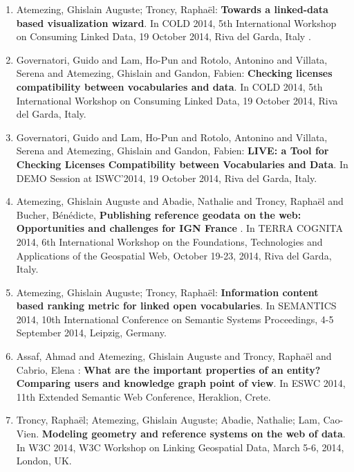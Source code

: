 \begin{enumerate}
\item Atemezing, Ghislain Auguste; Troncy,  Rapha{\"e}l: \textbf{{T}owards a linked-data based visualization wizard}. In {COLD} 2014, 5th {I}nternational {W}orkshop on {C}onsuming {L}inked {D}ata, 19 {O}ctober 2014, {R}iva del {G}arda, {I}taly .

\item {G}overnatori, {G}uido and  {L}am, {H}o-{P}un and  {R}otolo, {A}ntonino and  {V}illata, {S}erena and  {A}temezing, {G}hislain and  {G}andon, {F}abien: \textbf{{C}hecking licenses compatibility between vocabularies and data}. In {COLD} 2014, 5th {I}nternational {W}orkshop on {C}onsuming {L}inked {D}ata, 19 {O}ctober 2014, {R}iva del {G}arda, {I}taly.

\item {G}overnatori, {G}uido and  {L}am, {H}o-{P}un and  {R}otolo, {A}ntonino and  {V}illata, {S}erena and  {A}temezing, {G}hislain and  {G}andon, {F}abien: \textbf{LIVE: a Tool for Checking Licenses Compatibility between Vocabularies and Data}. In {DEMO Session} at ISWC'2014, 19 {O}ctober 2014, {R}iva del {G}arda, {I}taly.

\item{A}temezing, {G}hislain {A}uguste and  {A}badie, {N}athalie and  {T}roncy, {R}apha{\"e}l and  {B}ucher, {B}{\'e}n{\'e}dicte, \textbf{{P}ublishing reference geodata on the web: {O}pportunities and challenges for {IGN} {F}rance }. In {TERRA} {COGNITA} 2014, 6th {I}nternational {W}orkshop on the {F}oundations, {T}echnologies and {A}pplications of the {G}eospatial {W}eb, {O}ctober 19-23, 2014, {R}iva del {G}arda, {I}taly.

\item Atemezing, Ghislain Auguste; Troncy,  Rapha{\"e}l: \textbf{{I}nformation content based ranking metric for linked open vocabularies}. In {SEMANTICS} 2014, 10th {I}nternational {C}onference on {S}emantic {S}ystems {P}roceedings, 4-5 {S}eptember 2014, {L}eipzig, {G}ermany.

\item {A}ssaf, {A}hmad and  {A}temezing,  {G}hislain {A}uguste and  {T}roncy, {R}apha{\"e}l and  {C}abrio, {E}lena : \textbf{{W}hat are the important properties of an entity? {C}omparing users and knowledge graph point of view}. In {ESWC} 2014, 11th {E}xtended {S}emantic {W}eb {C}onference, {H}eraklion, {C}rete.

\item Troncy, Rapha{\"e}l; Atemezing, Ghislain Auguste; Abadie, Nathalie; Lam, Cao-Vien. \textbf{Modeling geometry and reference systems on the web of data}. In W3C 2014, W3C Workshop on Linking Geospatial Data, March 5-6, 2014, London, UK.


\end{enumerate}

